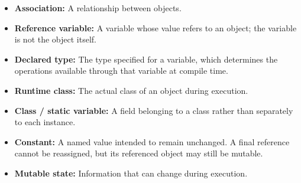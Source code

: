 \documentclass[11pt]{article}
\newenvironment{DottedList}{%
  \begin{itemize}[leftmargin=2em, itemsep=0.35em, topsep=0.35em, label=\textbullet]
}{%
  \end{itemize}
}
\begin{document}
\begin{DottedList}
  \item \textbf{Association:} A relationship between objects.
  \item \textbf{Reference variable:} A variable whose value refers to an object; the variable is not the object itself.
  \item \textbf{Declared type:} The type specified for a variable, which determines the operations available through that variable at compile time.
  \item \textbf{Runtime class:} The actual class of an object during execution.
  \item \textbf{Class / static variable:} A field belonging to a class rather than separately to each instance.
  \item \textbf{Constant:} A named value intended to remain unchanged. A final reference cannot be reassigned, but its referenced object may still be mutable.
  \item \textbf{Mutable state:} Information that can change during execution.
\end{DottedList}
\end{document}
